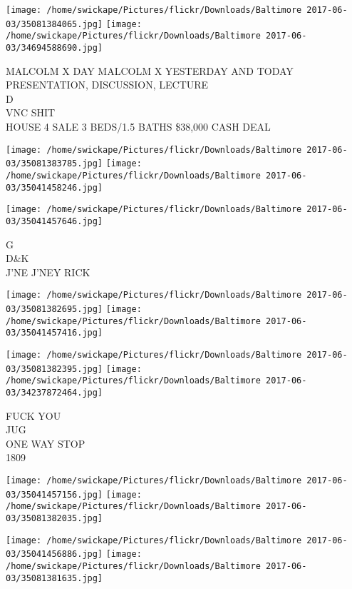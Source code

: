 \documentclass[10pt,letterpaper]{article}
\begin{document}
\texttt{[image: /home/swickape/Pictures/flickr/Downloads/Baltimore 2017-06-03/35081384065.jpg]}
\texttt{[image: /home/swickape/Pictures/flickr/Downloads/Baltimore 2017-06-03/34694588690.jpg]}

MALCOLM X DAY MALCOLM X YESTERDAY AND TODAY PRESENTATION, DISCUSSION, LECTURE\\
D\\
VNC SHIT\\
HOUSE 4 SALE 3 BEDS/1.5 BATHS \$38,000 CASH DEAL\\
\pagebreak

\texttt{[image: /home/swickape/Pictures/flickr/Downloads/Baltimore 2017-06-03/35081383785.jpg]}
\texttt{[image: /home/swickape/Pictures/flickr/Downloads/Baltimore 2017-06-03/35041458246.jpg]}

\vspace{0.25in}
\texttt{[image: /home/swickape/Pictures/flickr/Downloads/Baltimore 2017-06-03/35041457646.jpg]}

G\\
D\&K\\
J'NE J'NEY RICK\\
\pagebreak

\texttt{[image: /home/swickape/Pictures/flickr/Downloads/Baltimore 2017-06-03/35081382695.jpg]}
\texttt{[image: /home/swickape/Pictures/flickr/Downloads/Baltimore 2017-06-03/35041457416.jpg]}

\texttt{[image: /home/swickape/Pictures/flickr/Downloads/Baltimore 2017-06-03/35081382395.jpg]}
\texttt{[image: /home/swickape/Pictures/flickr/Downloads/Baltimore 2017-06-03/34237872464.jpg]}

FUCK YOU\\
JUG\\
ONE WAY STOP\\
1809\\
\pagebreak

\texttt{[image: /home/swickape/Pictures/flickr/Downloads/Baltimore 2017-06-03/35041457156.jpg]}
\texttt{[image: /home/swickape/Pictures/flickr/Downloads/Baltimore 2017-06-03/35081382035.jpg]}

\texttt{[image: /home/swickape/Pictures/flickr/Downloads/Baltimore 2017-06-03/35041456886.jpg]}
\texttt{[image: /home/swickape/Pictures/flickr/Downloads/Baltimore 2017-06-03/35081381635.jpg]}
\end{document}
